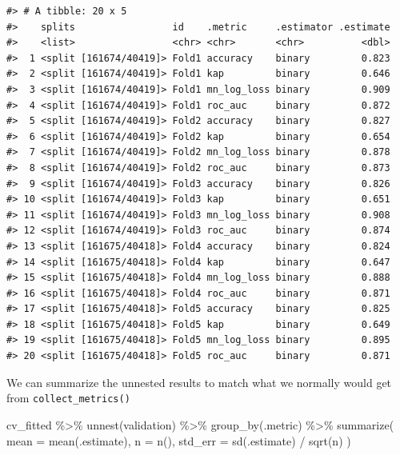 \documentclass[
]{krantz}
\makeatletter
\newenvironment{Shaded}{\begin{snugshade}}{\end{snugshade}}
\newcommand{\AttributeTok}[1]{\textcolor[rgb]{0.77,0.63,0.00}{#1}}
\newcommand{\FunctionTok}[1]{\textcolor[rgb]{0.00,0.00,0.00}{#1}}
\newcommand{\NormalTok}[1]{#1}
\newcommand{\SpecialCharTok}[1]{\textcolor[rgb]{0.00,0.00,0.00}{#1}}
\newenvironment{kframe}{%
\medskip{}
\setlength{\fboxsep}{.8em}
 \def\at@end@of@kframe{}%
 \ifinner\ifhmode%
  \def\at@end@of@kframe{\end{minipage}}%
  \begin{minipage}{\columnwidth}%
 \fi\fi%
 \def\FrameCommand##1{\hskip\@totalleftmargin \hskip-\fboxsep
 \colorbox{shadecolor}{##1}\hskip-\fboxsep
     \hskip-\linewidth \hskip-\@totalleftmargin \hskip\columnwidth}%
 \MakeFramed {\advance\hsize-\width
   \@totalleftmargin\z@ \linewidth\hsize
   \@setminipage}}%
 {\par\unskip\endMakeFramed%
 \at@end@of@kframe}
\renewenvironment{Shaded}{\begin{kframe}}{\end{kframe}}
\makeatother
\begin{document}
\begin{verbatim}
#> # A tibble: 20 x 5
#>    splits                 id    .metric     .estimator .estimate
#>    <list>                 <chr> <chr>       <chr>          <dbl>
#>  1 <split [161674/40419]> Fold1 accuracy    binary         0.823
#>  2 <split [161674/40419]> Fold1 kap         binary         0.646
#>  3 <split [161674/40419]> Fold1 mn_log_loss binary         0.909
#>  4 <split [161674/40419]> Fold1 roc_auc     binary         0.872
#>  5 <split [161674/40419]> Fold2 accuracy    binary         0.827
#>  6 <split [161674/40419]> Fold2 kap         binary         0.654
#>  7 <split [161674/40419]> Fold2 mn_log_loss binary         0.878
#>  8 <split [161674/40419]> Fold2 roc_auc     binary         0.873
#>  9 <split [161674/40419]> Fold3 accuracy    binary         0.826
#> 10 <split [161674/40419]> Fold3 kap         binary         0.651
#> 11 <split [161674/40419]> Fold3 mn_log_loss binary         0.908
#> 12 <split [161674/40419]> Fold3 roc_auc     binary         0.874
#> 13 <split [161675/40418]> Fold4 accuracy    binary         0.824
#> 14 <split [161675/40418]> Fold4 kap         binary         0.647
#> 15 <split [161675/40418]> Fold4 mn_log_loss binary         0.888
#> 16 <split [161675/40418]> Fold4 roc_auc     binary         0.871
#> 17 <split [161675/40418]> Fold5 accuracy    binary         0.825
#> 18 <split [161675/40418]> Fold5 kap         binary         0.649
#> 19 <split [161675/40418]> Fold5 mn_log_loss binary         0.895
#> 20 <split [161675/40418]> Fold5 roc_auc     binary         0.871
\end{verbatim}

We can summarize the unnested results to match what we normally would get from \texttt{collect\_metrics()}

\begin{Shaded}
\begin{Highlighting}[]
\NormalTok{cv\_fitted }\SpecialCharTok{\%\textgreater{}\%}
  \FunctionTok{unnest}\NormalTok{(validation) }\SpecialCharTok{\%\textgreater{}\%}
  \FunctionTok{group\_by}\NormalTok{(.metric) }\SpecialCharTok{\%\textgreater{}\%}
  \FunctionTok{summarize}\NormalTok{(}
    \AttributeTok{mean =} \FunctionTok{mean}\NormalTok{(.estimate),}
    \AttributeTok{n =} \FunctionTok{n}\NormalTok{(),}
    \AttributeTok{std\_err =} \FunctionTok{sd}\NormalTok{(.estimate) }\SpecialCharTok{/} \FunctionTok{sqrt}\NormalTok{(n)}
\NormalTok{  )}
\end{Highlighting}
\end{Shaded}
\end{document}
